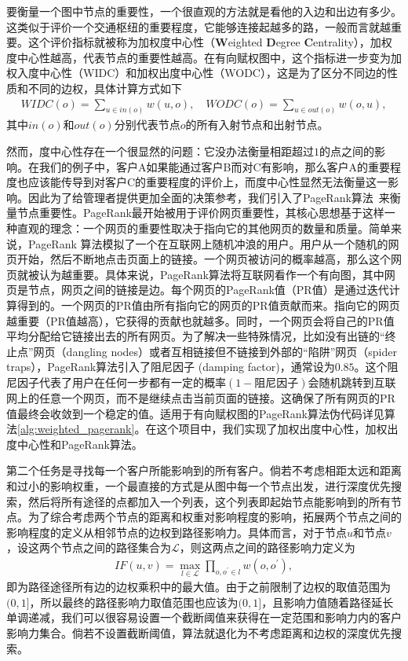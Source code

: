 \documentclass[cn,hazy,blue,10pt,normal]{elegantnote}
\begin{document}
要衡量一个图中节点的重要性，一个很直观的方法就是看他的入边和出边有多少。这类似于评价一个交通枢纽的重要程度，它能够连接起越多的路，一般而言就越重要。这个评价指标就被称为加权度中心性（\textbf{W}eighted \textbf{D}egree \textbf{C}entrality），加权度中心性越高，代表节点的重要性越高。在有向赋权图中，这个指标进一步变为加权入度中心性（WIDC）和加权出度中心性（WODC），这是为了区分不同边的性质和不同的边权，具体计算方式如下
\begin{align*}
    WIDC(o) = \sum_{u \in in(o)} w(u, o),\quad WODC(o) = \sum_{u\in out(o)} w(o, u),
\end{align*}
其中$in(o)$和$out(o)$分别代表节点$o$的所有入射节点和出射节点。

然而，度中心性存在一个很显然的问题：它没办法衡量相距超过$1$的点之间的影响。在我们的例子中，客户A如果能通过客户B而对C有影响，那么客户A的重要程度也应该能传导到对客户C的重要程度的评价上，而度中心性显然无法衡量这一影响。因此为了给管理者提供更加全面的决策参考，我们引入了PageRank算法~\citep{Page1999ThePC}来衡量节点重要性。PageRank最开始被用于评价网页重要性，其核心思想基于这样一种直观的理念：一个网页的重要性取决于指向它的其他网页的数量和质量。简单来说，PageRank 算法模拟了一个在互联网上随机冲浪的用户。用户从一个随机的网页开始，然后不断地点击页面上的链接。一个网页被访问的概率越高，那么这个网页就被认为越重要。具体来说，PageRank算法将互联网看作一个有向图，其中网页是节点，网页之间的链接是边。每个网页的PageRank值（PR值）是通过迭代计算得到的。一个网页的PR值由所有指向它的网页的PR值贡献而来。指向它的网页越重要（PR值越高），它获得的贡献也就越多。同时，一个网页会将自己的PR值平均分配给它链接出去的所有网页。为了解决一些特殊情况，比如没有出链的“终止点”网页（dangling nodes）或者互相链接但不链接到外部的“陷阱”网页（spider traps），PageRank算法引入了阻尼因子 (damping factor)，通常设为$0.85$。这个阻尼因子代表了用户在任何一步都有一定的概率$(1 - \text{阻尼因子})$会随机跳转到互联网上的任意一个网页，而不是继续点击当前页面的链接。这确保了所有网页的PR值最终会收敛到一个稳定的值。适用于有向赋权图的PageRank算法伪代码详见算法\ref{alg:weighted_pagerank}。在这个项目中，我们实现了加权出度中心性，加权出度中心性和PageRank算法。





第二个任务是寻找每一个客户所能影响到的所有客户。倘若不考虑相距太远和距离和过小的影响权重，一个最直接的方式是从图中每一个节点出发，进行深度优先搜索，然后将所有途径的点都加入一个列表，这个列表即起始节点能影响到的所有节点。为了综合考虑两个节点的距离和权重对影响程度的影响，拓展两个节点之间的影响程度的定义从相邻节点的边权到路径影响力。具体而言，对于节点$u$和节点$v$，设这两个节点之间的路径集合为$\mathcal{L}$，则这两点之间的路径影响力定义为
\begin{align*}
    IF(u, v) = \max_{l\in \mathcal{L}} \prod_{o, o^\prime \in l} w(o, o^\prime),
\end{align*}
即为路径途径所有边的边权乘积中的最大值。由于之前限制了边权的取值范围为$(0, 1]$，所以最终的路径影响力取值范围也应该为$(0, 1]$，且影响力值随着路径延长单调递减，我们可以很容易设置一个截断阈值来获得在一定范围和影响力内的客户影响力集合。倘若不设置截断阈值，算法就退化为不考虑距离和边权的深度优先搜索。
\end{document}
